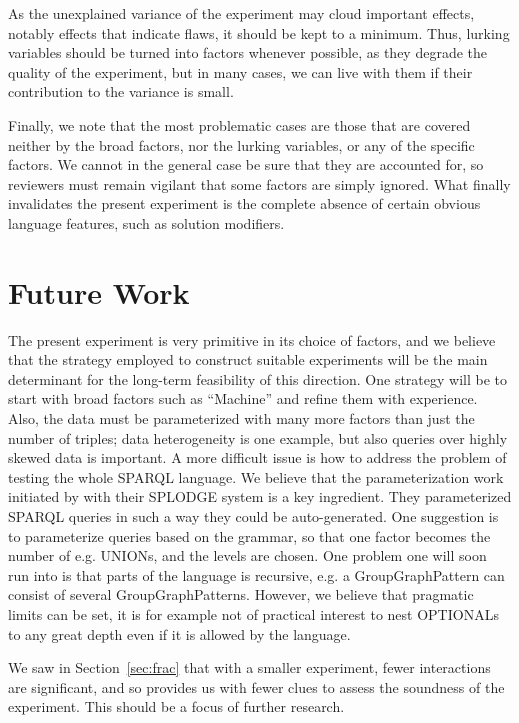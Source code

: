 \documentclass{llncs}
\begin{document}
As the unexplained variance of the experiment may cloud important
effects, notably effects that indicate flaws, it should be kept to a
minimum. Thus, lurking variables should be turned into factors
whenever possible, as they degrade the quality of the experiment, but
in many cases, we can live with them if their contribution to the
variance is small.

Finally, we note that the most problematic cases are those that are
covered neither by the broad factors, nor the lurking variables, or
any of the specific factors. We cannot in the general case be sure
that they are accounted for, so reviewers must remain vigilant that
some factors are simply ignored. What finally invalidates the present
experiment is the complete absence of certain obvious language
features, such as solution modifiers.

\section{Future Work}

The present experiment is very primitive in its choice of factors, and
we believe that the strategy employed to construct suitable
experiments will be the main determinant for the long-term feasibility
of this direction. One strategy will be to start with broad factors
such as ``Machine'' and refine them with experience. Also, the data
must be parameterized with many more factors than just the number of
triples; data heterogeneity \cite{Duan:2011:AOC:1989323.1989340} is one
example, but also queries over highly skewed data is important. A more
difficult issue is how to address the problem of testing the whole
SPARQL language\cite{sparql11query}. We believe that the
parameterization work initiated by \cite{goerlitz2012splodge} with
their SPLODGE system is a key ingredient. They parameterized SPARQL
queries in such a way they could be auto-generated. One suggestion is
to parameterize queries based on the grammar, so that one factor
becomes the number of e.g. UNIONs, and the levels are chosen. One
problem one will soon run into is that parts of the language is
recursive, e.g. a GroupGraphPattern can consist of several
GroupGraphPatterns. However, we believe that pragmatic limits can be
set, it is for example not of practical interest to nest OPTIONALs to
any great depth even if it is allowed by the language.

We saw in Section~\ref{sec:frac} that with a smaller experiment, fewer
interactions are significant, and so provides us with fewer clues to
assess the soundness of the experiment. This should be a focus of
further research.
\end{document}
